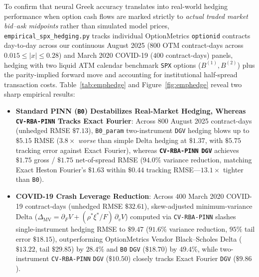 \documentclass[11pt,a4paper]{article}
\begin{document}
To confirm that neural Greek accuracy translates into real-world hedging performance when option cash flows are marked strictly to \emph{actual traded market bid--ask midpoints} rather than simulated model prices, \texttt{empirical\_spx\_hedging.py} tracks individual OptionMetrics \texttt{optionid} contracts day-to-day across our continuous August 2025 ($800$ OTM contract-days across $0.015 \le |x| \le 0.28$) and March 2020 COVID-19 ($400$ contract-days) panels, hedging with two liquid ATM calendar benchmark \texttt{SPX} options ($B^{(1)}, B^{(2)}$) plus the parity-implied forward move and accounting for institutional half-spread transaction costs. Table~\ref{tab:emphedge} and Figure~\ref{fig:emphedge} reveal two sharp empirical results:
\begin{itemize}
  \item \textbf{Standard PINN (\texttt{B0}) Destabilizes Real-Market Hedging, Whereas \texttt{CV-RBA-PINN} Tracks Exact Fourier}: Across $800$ August 2025 contract-days (unhedged RMSE $\$7.13$), \texttt{B0\_param} two-instrument \texttt{DGV} hedging blows up to $\mathbf{\$5.15}$ RMSE ($3.8\times$ \emph{worse} than simple Delta hedging at $\$1.37$, with $\$5.75$ tracking error against Exact Fourier), whereas \textbf{\texttt{CV-RBA-PINN} \texttt{DGV}} achieves $\mathbf{\$1.75}$ gross / $\mathbf{\$1.75}$ net-of-spread RMSE ($\mathbf{94.0\%}$ variance reduction, matching Exact Heston Fourier's $\$1.63$ within $\mathbf{\$0.44}$ tracking RMSE---$\mathbf{13.1\times}$ tighter than \texttt{B0}).
  \item \textbf{COVID-19 Crash Leverage Reduction}: Across $400$ March 2020 COVID-19 contract-days (unhedged RMSE $\$32.61$), skew-adjusted minimum-variance Delta ($\Delta_{\mathrm{MV}} = \partial_F V + (\rho^*\xi^*/F)\,\partial_v V$) computed via \texttt{CV-RBA-PINN} slashes single-instrument hedging RMSE to $\mathbf{\$9.47}$ ($\mathbf{91.6\%}$ variance reduction, $95\%$ tail error $\$18.15$), outperforming OptionMetrics Vendor Black--Scholes Delta ($\$13.22$, tail $\$29.85$) by $\mathbf{28.4\%}$ and \texttt{B0} \texttt{DGV} ($\$18.70$) by $\mathbf{49.4\%}$, while two-instrument \texttt{CV-RBA-PINN} \texttt{DGV} ($\$10.50$) closely tracks Exact Fourier \texttt{DGV} ($\$9.86$).
\end{itemize}
\end{document}
